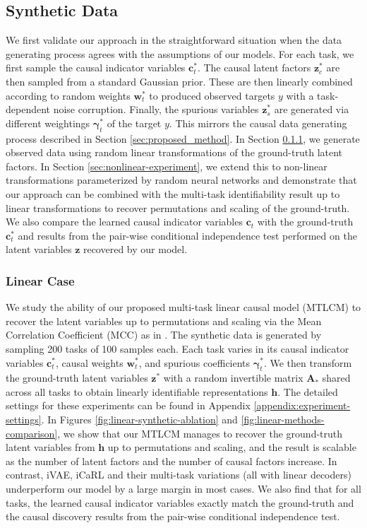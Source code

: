 \documentclass[nohyperref]{article}
\theoremstyle{plain}
\theoremstyle{definition}
\theoremstyle{remark}
\begin{document}
\subsection{Synthetic Data}
We first validate our approach in the straightforward situation when the data generating process 
agrees with the assumptions of our models. For each task, we first sample the causal indicator variables $\mathbf{c}_t^*$. The causal latent factors $\mathbf{z}_c^*$ are then sampled from a standard Gaussian prior. These are then linearly combined according to random weights $\mathbf{w}_t^*$ to produced observed 
targets $y$ with a task-dependent noise corruption. Finally, the spurious variables $\mathbf{z}_s^*$ are generated via different weightings $\boldsymbol{\gamma}_t^*$ of the target $y$. This mirrors the causal data generating process described in Section \ref{sec:proposed_method}. In Section \ref{sec:linear-experiment}, we generate
observed data using random linear transformations of the ground-truth latent factors. 
In Section \ref{sec:nonlinear-experiment}, we extend this to non-linear transformations parameterized by random neural networks and demonstrate that our approach can be combined with 
the multi-task identifiability result up to linear transformations to recover permutations and scaling of the ground-truth.
We also compare the learned causal indicator variables $\mathbf{c}_t$ with the ground-truth $\mathbf{c}_t^{*}$ and results from the pair-wise conditional independence test \citep{chen2021causal,Lu_Wu_Hernandez-Lobato_Scholkopf_2022} performed on the latent variables $\mathbf{z}$ recovered by our model.

\subsubsection{Linear Case}\label{sec:linear-experiment}
We study the ability of our proposed multi-task linear causal model (MTLCM) to recover the latent variables up to permutations and scaling via the Mean Correlation Coefficient (MCC) as in \citet{Khemakhem_Kingma_Monti_Hyvarinen_2020}. The synthetic data is generated by sampling 200 tasks of 100 samples each. Each task
varies in its causal indicator variables $\mathbf{c}_t^*$, causal weights $\mathbf{w}_t^*$, and spurious coefficients $\boldsymbol{\gamma}_t^*$. We then transform the ground-truth latent variables $\mathbf{z}^*$ with a random invertible matrix $\mathbf{A}_*$ shared across all tasks to obtain linearly identifiable representations $\mathbf{h}$.
The detailed settings for these experiments can be found in Appendix \ref{appendix:experiment-settings}.
In Figures \ref{fig:linear-synthetic-ablation} and \ref{fig:linear-methods-comparison}, we show that our MTLCM manages to recover the ground-truth latent variables from $\mathbf{h}$ up to permutations and scaling, and the result is scalable as the number of latent factors and the number of causal factors increase. In contrast, iVAE, iCaRL and their multi-task variations (all with linear decoders) underperform our model by a large margin in most cases.
We also find that for all tasks, the learned causal indicator variables exactly match the ground-truth and the causal discovery results from the pair-wise conditional independence test.
\end{document}
